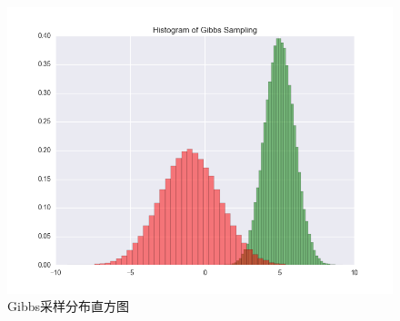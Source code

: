 \documentclass{ctexart}
\begin{document}
\begin{figure}[H]
\begin{center}
\includegraphics[width=1\textwidth]{fig/gibbs_hist.png} %
\caption{Gibbs采样分布直方图}
\end{center}
\end{figure}


%
\end{document}
